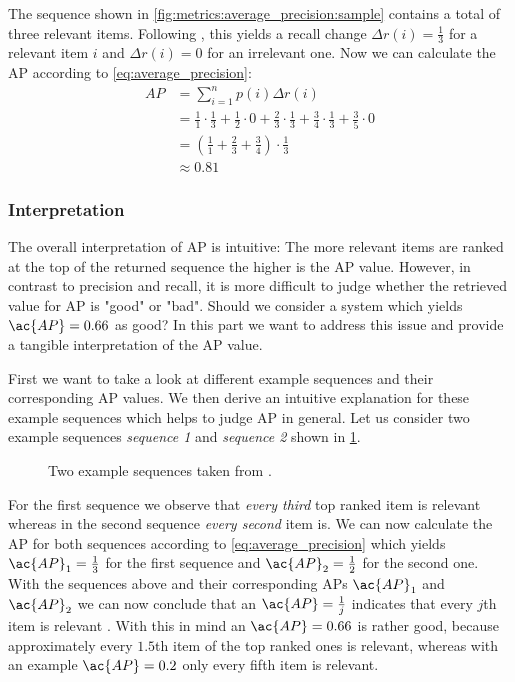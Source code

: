 The sequence shown in \cref{fig:metrics:average_precision:sample} contains a total of three relevant items.
Following \textcite{Zhu:2004}, this yields a recall change $\Delta r(i)=\frac{1}{3}$ for a relevant item $i$ and $\Delta r(i)=0$ for an irrelevant one.
Now we can calculate the \ac{AP} according to \cref{eq:average_precision}:
\begin{equation}
    \begin{aligned}
        AP &= \sum_{i=1}^n {p(i)\Delta r(i)}\\
        &= \frac{1}{1} \cdot \frac{1}{3} + \frac{1}{2} \cdot 0 + \frac{2}{3} \cdot \frac{1}{3} + \frac{3}{4} \cdot \frac{1}{3} + \frac{3}{5} \cdot 0\\
        &=  (\frac{1}{1} + \frac{2}{3}  + \frac{3}{4}) \cdot \frac{1}{3}\\
        &\approx 0.81
    \end{aligned}
\end{equation}

\subsubsection{Interpretation}
\label{chp:fundamentals:sec:metrics:subsec:average_precision:interpretation}
The overall interpretation of \ac{AP} is intuitive: The more relevant items are ranked at the top of the returned sequence the higher is the \ac{AP} value.
However, in contrast to precision and recall, it is more difficult to judge whether the retrieved value for \ac{AP} is "good" or "bad".
Should we consider a system which yields $\ac{AP}=0.66$ as good?
In this part we want to address this issue and provide a tangible interpretation of the \ac{AP} value.

First we want to take a look at different example sequences and their corresponding \ac{AP} values.
We then derive an intuitive explanation for these example sequences which helps to judge \ac{AP} in general.
Let us consider two example sequences \textit{sequence 1} and \textit{sequence 2} shown in \cref{fig:metrics:average_precision:interpreation:sample}.

\begin{figure}[htpb]
    \centering
    \def\svgwidth{\columnwidth}
    
    \caption[Two Example Sequences]{Two example sequences taken from \textcite{Tapaswi:2012}.}\label{fig:metrics:average_precision:interpreation:sample}
\end{figure}

For the first sequence we observe that \textit{every third} top ranked item is relevant whereas in the second sequence \textit{every second} item is.
We can now calculate the \ac{AP} for both sequences according to \cref{eq:average_precision} which yields $\ac{AP}_1= \frac{1}{3}$ for the first sequence and $\ac{AP}_2= \frac{1}{2}$ for the second one.
With the sequences above and their corresponding \acp{AP} $\ac{AP}_1$ and $\ac{AP}_2$ we can now conclude that an $\ac{AP}=\frac{1}{j}$ indicates that every $j$th item is relevant \parencite{Tapaswi:2012}.
With this in mind an $\ac{AP}=0.66$ is rather good, because approximately every $1.5$th item of the top ranked ones is relevant, whereas with an example $\ac{AP}=0.2$ only every fifth item is relevant.
